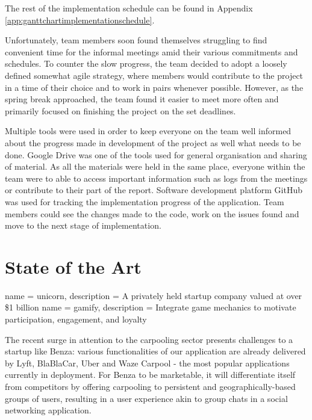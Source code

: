 \documentclass{article}
\begin{document}
    The rest of the implementation schedule can be found in Appendix \ref{app:ganttchartimplementationschedule}. \par
    
    Unfortunately, team members soon found themselves struggling to find convenient time for the informal meetings amid their various commitments and schedules. To counter the slow progress, the team decided to adopt a loosely defined somewhat agile strategy, where members would contribute to the project in a time of their choice and to work in pairs whenever possible. However, as the spring break approached, the team found it easier to meet more often and primarily focused on finishing the project on the set deadlines.\par
    
    Multiple tools were used in order to keep everyone on the team well informed about the progress made in development of the project as well what needs to be done. Google Drive was one of the tools used for general organisation and sharing of material. As all the materials were held in the same place, everyone within the team were to able to access important information such as logs from the meetings or contribute to their part of the report. Software development platform GitHub was used for tracking the implementation progress of the application. Team members could see the changes made to the code, work on the issues found and move to the next stage of implementation. \par


\newpage
\section{State of the Art}
\label{sec:stateoftheart}
    {
        name = unicorn,
        description = {A privately held startup company valued at over \$1 billion}
    }
    {
        name = gamify,
        description = {Integrate game mechanics to motivate participation, engagement, and loyalty}
    }
    
    The recent surge in attention to the carpooling sector presents challenges to a startup like Benza: various functionalities of our application are already delivered by Lyft, BlaBlaCar, Uber and Waze Carpool - the most popular applications currently in deployment. For Benza to be marketable, it will differentiate itself from competitors by offering carpooling to persistent and geographically-based groups of users, resulting in a user experience akin to group chats in a social networking application. \par
\end{document}
